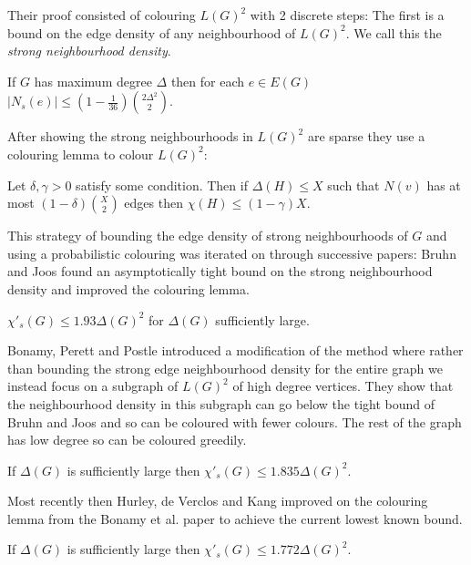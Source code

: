 Their proof consisted of colouring $L(G)^2$ with 2 discrete steps:
The first is a bound on the edge density of any neighbourhood of $L(G)^2$. We call
this the \textit{strong neighbourhood density}.
\begin{knownlemma}
    If $G$ has maximum degree $\Delta$ then for each $e\in E(G)$
    $|N_s(e)| \leq (1-\frac{1}{36})\binom{2\Delta^2}{2}$.
\end{knownlemma}
After showing the strong neighbourhoods in $L(G)^2$ are sparse they use a colouring
lemma to colour $L(G)^2$:
\begin{knownlemma}
    Let $\delta, \gamma > 0$ satisfy some condition. Then if
    $\Delta(H) \leq X$ such that $N(v)$ has at most $(1-\delta)\binom{X}{2}$ edges
    then $\chi(H)\leq (1-\gamma)X$.
\end{knownlemma}

This strategy of bounding the edge density of strong neighbourhoods of $G$ and
using a probabilistic colouring was iterated on through successive papers:
Bruhn and Joos found an asymptotically tight bound on the strong neighbourhood density
and improved the colouring lemma.
\begin{knowntheorem}
    $\chi'_s(G) \leq 1.93\Delta(G)^2$ for $\Delta(G)$ sufficiently large.
\end{knowntheorem}
Bonamy, Perett and Postle introduced a modification of the method where rather than
bounding the strong edge neighbourhood density for the entire graph we instead focus
on a subgraph of $L(G)^2$ of high degree vertices. They show that the
neighbourhood density in this subgraph can go below the tight bound of Bruhn and Joos
and so can be coloured with fewer colours. The rest of the graph has low degree so can
be coloured greedily.

\begin{knowntheorem}
    If $\Delta(G)$ is sufficiently large then
    $\chi'_s(G) \leq 1.835\Delta(G)^2$.
\end{knowntheorem}

Most recently then Hurley, de Verclos and Kang improved on the colouring lemma from the
Bonamy et al. paper to achieve the current lowest known bound.
\begin{knowntheorem}
    If $\Delta(G)$ is sufficiently large then
    $\chi'_s(G) \leq 1.772\Delta(G)^2$.
\end{knowntheorem}

